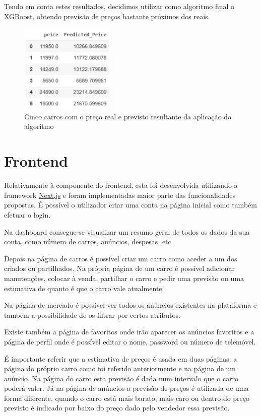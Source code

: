 \documentclass[a4paper]{report}
\begin{document}
Tendo em conta estes resultados, decidimos utilizar como algoritmo final o XGBoost, obtendo 
previsão de preços bastante próximos dos reais.

\begin{figure}[H]
    \centering
    \includegraphics[width=0.4\textwidth]{images/resultados_prices.png}
    \caption{Cinco carros com o preço real e previsto resultante da aplicação do algoritmo}
\end{figure}

\chapter{Frontend}

Relativamente à componente do frontend, esta foi desenvolvida utilizando a framework
\href{http://nextjs.org}{Next.js} e
foram implementadas maior parte das funcionalidades propostas. 
É possível o utilizador criar uma conta na página inicial como também efetuar o login. 

Na dashboard consegue-se visualizar um resumo geral de todos os dados da sua conta, como número de
carros, anúncios, despesas, etc. 

Depois na página de carros é possível criar um carro como aceder a um dos criados ou partilhados. Na
própria página de um carro é possível adicionar manutenções, colocar à venda, partilhar o carro e pedir
uma previsão ou uma estimativa de quanto é que o carro vale atualmente.

Na página de mercado é possível ver todos os anúncios existentes na plataforma e também a possibilidade
de os filtrar por certos atributos. 

Existe também a página de favoritos onde irão aparecer os 
anúncios favoritos e a página de perfil onde é possível editar o nome, password ou número de telemóvel.

É importante referir que a estimativa de preços é usada em duas páginas: a página do próprio carro como
foi referido anteriormente e na página de um anúncio.
Na página do carro esta previsão é dada num intervalo que o carro poderá valer. Já na página de 
anúncios a previsão de preços é utilizada de uma forma diferente, quando o carro está mais barato, mais
caro ou dentro do preço previsto é indicado por baixo do preço dado pelo vendedor essa previsão.
\end{document}
